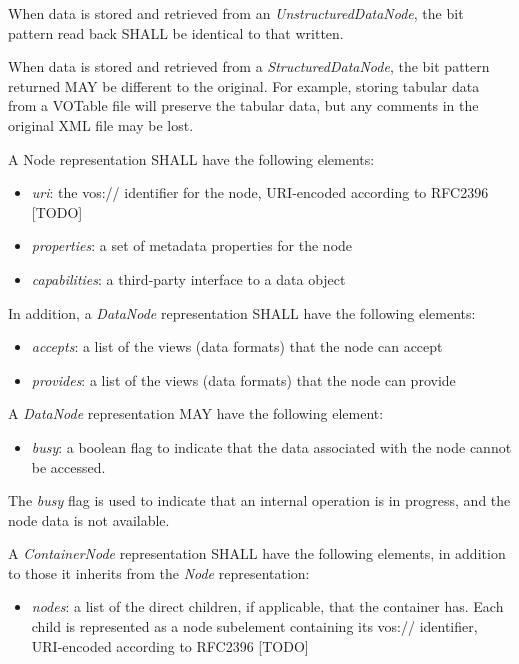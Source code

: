 \documentclass[11pt,a4paper]{ivoa}
\begin{document}
When data is stored and retrieved from an \emph{UnstructuredDataNode}, the bit pattern read back SHALL be identical to that written.

When data is stored and retrieved from a \emph{StructuredDataNode}, the bit pattern returned MAY be different to the original. For example, storing tabular data from a VOTable file will preserve the tabular data, but any comments in the original XML file may be lost.

A Node representation SHALL have the following elements:

\begin{itemize}
    \item \emph{uri}: the vos:// identifier for the node, URI-encoded according to RFC2396 [TODO]
    \item \emph{properties}: a set of metadata properties for the node
    \item \emph{capabilities}: a third-party interface to a data object
\end{itemize}

In addition, a \emph{DataNode} representation SHALL have the following elements:

\begin{itemize}
    \item \emph{accepts}: a list of the views (data formats) that the node can accept
    \item \emph{provides}: a list of the views (data formats) that the node can provide
\end{itemize}

A \emph{DataNode} representation MAY have the following element:

\begin{itemize}
    \item \emph{busy}: a boolean flag to indicate that the data associated with the node cannot be accessed.
\end{itemize}

The \emph{busy} flag is used to indicate that an internal operation is in progress, and the node data is not available.

A \emph{ContainerNode} representation SHALL have the following elements, in addition to those it inherits from the \emph{Node} representation:

\begin{itemize}
    \item \emph{nodes}: a list of the direct children, if applicable, that the container has. Each child is represented as a node subelement containing its vos:// identifier, URI-encoded according to RFC2396 [TODO]
\end{itemize}
\end{document}
